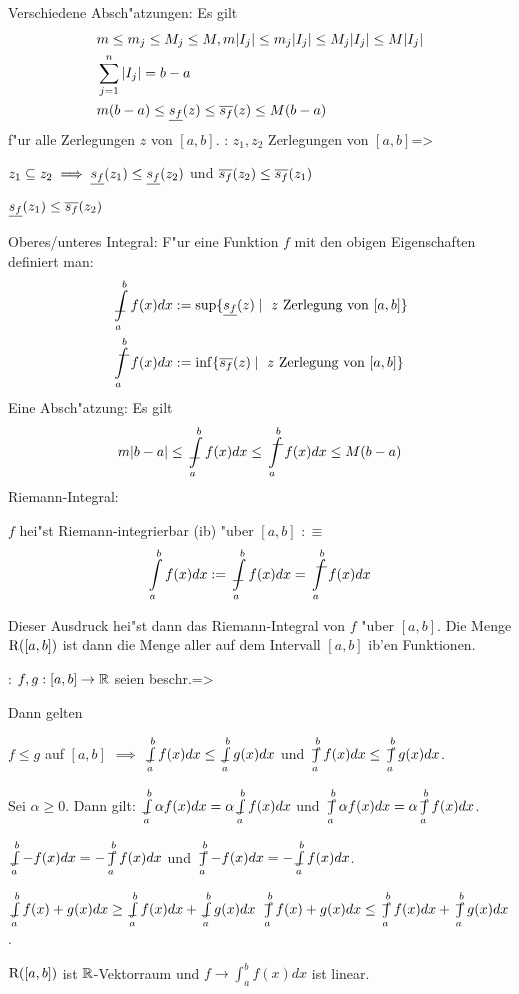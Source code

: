 \remark Verschiedene Absch"atzungen:{
  Es gilt
  \begin{align*}
    &m\le m_j\le M_j\le M, m|I_j|\le m_j|I_j|\le M_j|I_j|\le M|I_j| \\
    &\sum_{j=1}^n |I_j|=b-a \\
    &m(b-a)\le \lsum(z) \le \usum(z) \le M(b-a)
    \end{align*}
  f"ur alle Zerlegungen $z$ von $[a,b]$.
  }
\theorem:
  $z_1,z_2$ Zerlegungen von $[a,b]$=>{
  \begin{stmts}
    \item $z_1\subseteq z_2 \implies \underline{s_f}(z_1)\le\underline{s_f}(z_2)$ und 
          $\overline{s_f}(z_2) \le \overline{s_f}(z_1)$ 
    \item $\underline{s_f}(z_1)\le\overline{s_f}(z_2)$
    \end{stmts}
  }
 Oberes/unteres Integral:{
  F"ur eine Funktion $f$ mit den obigen Eigenschaften definiert man:
  \begin{align*}
    \lint_a^b f(x)dx &:= \sup \{\lsum(z)\mid \text{ $z$ Zerlegung von $[a,b]$}\}\\
    \uint_a^b f(x)dx &:= \inf \{\usum(z)\mid \text{ $z$ Zerlegung von $[a,b]$}\}
    \end{align*}
  }
\remark Eine Absch"atzung:{
  Es gilt 
  \[m|b-a|\le\lint_a^b f(x)dx\le\uint_a^b f(x) dx\le M(b-a)
    \]
}
 Riemann-Integral:{
  $f$ hei"st Riemann-integrierbar (ib) "uber $[a,b]$ $:\equiv$
  \[
    \int_a^b f(x)dx:= \lint_a^b f(x)dx = \uint_a^b f(x)dx
  \]

  Dieser Ausdruck hei"st dann das Riemann-Integral von $f$ "uber $[a,b]$.
  Die Menge ${\rm R}([a,b])$ ist dann die Menge aller auf dem Intervall
  $[a,b]$ ib'en Funktionen.
  }
\theorem: $f,g:[a,b]\to\mathbb R$ seien beschr.=>{
  Dann gelten
  \begin{stmts}
    \item $f\le g$ auf $[a,b]$ $\implies$ $\lint_a^b f(x)dx\le\lint_a^b g(x)dx$ und
      $\uint_a^b f(x)dx\le\uint_a^b g(x)dx$.
    \item Sei $\alpha\ge 0$. Dann gilt:
      $\lint_a^b \alpha f(x)dx=\alpha \lint_a^b f(x)dx$ und 
      $\uint_a^b \alpha f(x)dx=\alpha \uint_a^b f(x)dx$.
    \item $\lint_a^b - f(x)dx=- \uint_a^b f(x)dx$ und 
      $\uint_a^b - f(x)dx=- \lint_a^b f(x)dx$.
    \item $\lint_a^b f(x)+g(x)dx\ge \lint_a^b f(x)dx+\lint_a^b g(x)dx$
      $\uint_a^b f(x)+g(x)dx\le \uint_a^b f(x)dx+\uint_a^b g(x)dx$.
    \item ${\rm R}([a,b])$ ist $\mathbb R$-Vektorraum  
      und $f\to\int_a^b f(x)dx$ ist linear.
    \end{stmts}
  }
